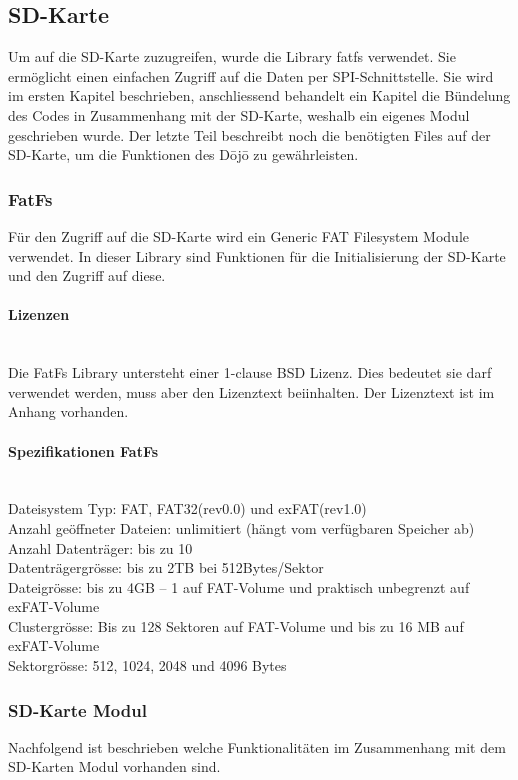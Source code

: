 \subsection{SD-Karte}\label{sec:sdKarte}
Um auf die SD-Karte zuzugreifen, wurde die Library fatfs verwendet. Sie ermöglicht einen einfachen Zugriff auf die Daten per SPI-Schnittstelle. Sie wird im ersten Kapitel beschrieben, anschliessend behandelt ein Kapitel die Bündelung des Codes in Zusammenhang mit der SD-Karte, weshalb ein eigenes Modul geschrieben wurde. Der letzte Teil beschreibt noch die benötigten Files auf der SD-Karte, um die Funktionen des Dōjō zu gewährleisten.

\subsubsection{FatFs}
Für den Zugriff auf die SD-Karte wird ein Generic FAT Filesystem Module verwendet. In dieser Library sind Funktionen für die Initialisierung der SD-Karte und den Zugriff auf diese.

\paragraph{Lizenzen}$~~$\\
Die FatFs Library untersteht einer 1-clause BSD Lizenz. Dies bedeutet sie darf verwendet werden, muss aber den Lizenztext beiinhalten. Der Lizenztext ist im Anhang vorhanden.

\paragraph{Spezifikationen FatFs}$~~$\\
Dateisystem Typ: FAT, FAT32(rev0.0) und exFAT(rev1.0)\\
Anzahl geöffneter Dateien: unlimitiert (hängt vom verfügbaren Speicher ab)\\
Anzahl Datenträger: bis zu 10\\
Datenträgergrösse: bis zu 2TB bei 512Bytes/Sektor\\
Dateigrösse: bis zu 4GB – 1 auf FAT-Volume und praktisch unbegrenzt auf exFAT-Volume\\
Clustergrösse: Bis zu 128 Sektoren auf FAT-Volume und bis zu 16 MB auf exFAT-Volume	\\
Sektorgrösse:  512, 1024, 2048 und 4096 Bytes \cite{FatFs}\\ 


\subsubsection{SD-Karte Modul}
Nachfolgend ist beschrieben welche Funktionalitäten im Zusammenhang mit dem SD-Karten Modul vorhanden sind.

